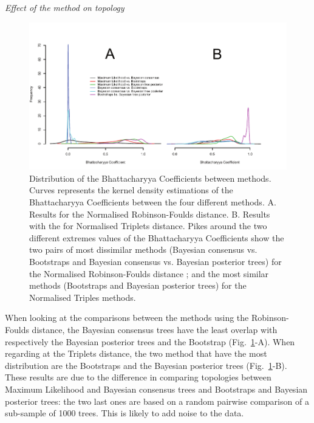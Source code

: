 \documentclass[12pt,letterpaper]{article}
\renewcommand{\subsection}[1]{%
\bigskip
\begin{center}
\begin{large}
\normalfont\itshape #1
\end{large}
\end{center}}
\begin{document}
\subsection{Effect of the method on topology}

\begin{figure} 
\centering
    \includegraphics[width=1\textwidth]{Figures/In_main/BC-MethodComp-RF+Tr-colour.pdf}
\caption{Distribution of the Bhattacharyya Coefficients between methods. Curves represents the kernel density estimations of the Bhattacharyya Coefficients between the four different methods. A. Results for the Normalised Robinson-Foulds distance. B. Results with the for Normalised Triplets distance. Pikes around the two different extremes values of the Bhattacharyya Coefficients show the two pairs of most dissimilar methods (Bayesian consensus vs. Bootstraps and Bayesian consensus vs. Bayesian posterior trees) for the Normalised Robinson-Foulds distance ; and the most similar methods (Bootstraps and Bayesian posterior trees) for the Normalised Triples methods.}
\label{Fig_Results-paircomp_without} %
\end{figure}

When looking at the comparisons between the methods using the Robinson-Foulds distance, the Bayesian consensus trees have the least overlap with respectively the Bayesian posterior trees and the Bootstrap (Fig.~\ref{Fig_Results-paircomp_without}-A). When regarding at the Triplets distance, the two method that have the most distribution are the Bootstraps and the Bayesian posterior trees (Fig.~\ref{Fig_Results-paircomp_without}-B). These results are due to the difference in comparing topologies between Maximum Likelihood and Bayesian consensus trees and Bootstraps and Bayesian posterior trees: the two last ones are based on a random pairwise comparison of a sub-sample of 1000 trees. This is likely to add noise to the data.
\end{document}
